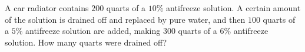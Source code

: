A car radiator contains $200$ quarts of a $10\%$ antifreeze solution. A certain amount of the solution is drained off and replaced by pure water, and then $100$ quarts of a $5\%$ antifreeze solution are added, making $300$ quarts of a $6\%$ antifreeze solution. How many quarts were drained off?
